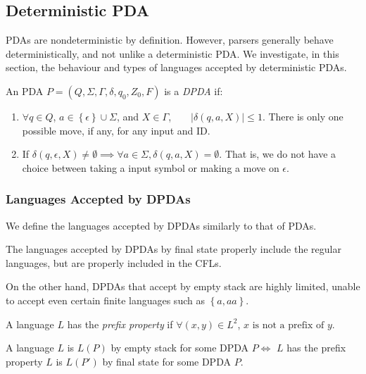 \subsection{Deterministic PDA}
PDAs are nondeterministic by definition. However, parsers generally behave
deterministically, and not unlike a deterministic PDA\@. We investigate, in this
section, the behaviour and types of languages accepted by deterministic PDAs.

\begin{definition}[DPDA]
  An PDA $P=\left( Q,\Sigma,\Gamma,\delta,q_0,Z_0,F \right) $ is a \textit{DPDA} if:
  \begin{enumerate}
    \item $\forall q\in Q$, $a\in \left\{ \epsilon \right\} \cup \Sigma$, and
      $X\in \Gamma$,$\qquad\left| \delta\left( q,a,X \right) \right| \le 1$.
      There is only one possible move, if any, for any input and ID.
    \item If $\delta\left( q,\epsilon,X \right)\neq \emptyset\implies\forall
      a\in \Sigma, \delta\left( q,a,X \right)=\emptyset $. That is, we do not
      have a choice between taking a input symbol or making a move on
      $\epsilon$.
  \end{enumerate}
\end{definition}

\subsubsection{Languages Accepted by DPDAs}
We define the languages accepted by DPDAs similarly to that of PDAs.

\begin{theorem}
  The languages accepted by DPDAs by final state properly include the regular
  languages, but are properly included in the CFLs.
\end{theorem}
On the other hand, DPDAs that accept by empty stack are highly limited, unable
to accept even certain finite languages such as $\left\{ a,aa \right\}$.
\begin{definition}
  A language $L$ has the \textit{prefix property} if $\forall \left( x,y
  \right) \in L^{2}$, $x\text{ is not a prefix of }y$.
\end{definition}
\begin{theorem}
  A language $L$ is $L(P)$ by empty stack for some DPDA $P\iff$ $L$ has the
  prefix property $L$ is $L(P')$ by final state for some DPDA $P$.
\end{theorem}

